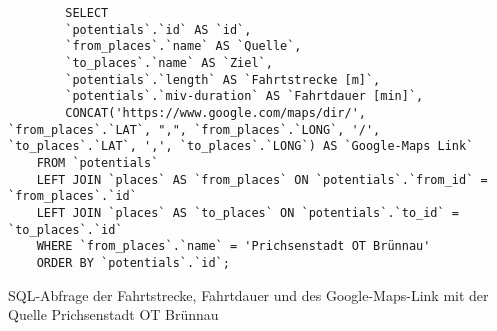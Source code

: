 \begin{listing}[htbp]
    \begin{verbatim}
        SELECT 
        `potentials`.`id` AS `id`, 
        `from_places`.`name` AS `Quelle`,
        `to_places`.`name` AS `Ziel`, 
        `potentials`.`length` AS `Fahrtstrecke [m]`, 
        `potentials`.`miv-duration` AS `Fahrtdauer [min]`,
        CONCAT('https://www.google.com/maps/dir/', `from_places`.`LAT`, ",", `from_places`.`LONG`, '/', `to_places`.`LAT`, ',', `to_places`.`LONG`) AS `Google-Maps Link`
    FROM `potentials`
    LEFT JOIN `places` AS `from_places` ON `potentials`.`from_id` = `from_places`.`id`
    LEFT JOIN `places` AS `to_places` ON `potentials`.`to_id` = `to_places`.`id`
    WHERE `from_places`.`name` = 'Prichsenstadt OT Brünnau'
    ORDER BY `potentials`.`id`;
    \end{verbatim}
    \caption{SQL-Abfrage der Fahrtstrecke, Fahrtdauer und des Google-Maps-Link mit der Quelle Prichsenstadt OT Brünnau}\label{lst-f-bruennau}
\end{listing}